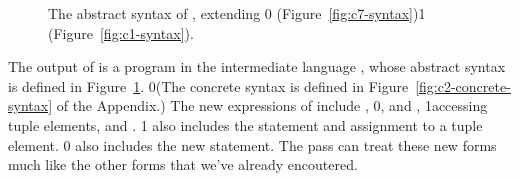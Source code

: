 \documentclass[7x10,nocrop]{TimesAPriori_MIT}%
\newcommand{\gray}[1]{{\color{gray} #1}}
\def\racketEd{0}
\def\pythonEd{1}
\def\edition{1}
\newcommand{\racket}[1]{{\if\edition\racketEd{#1}\fi}}
\newcommand{\python}[1]{{\if\edition\pythonEd #1\fi}}
\begin{document}
\newcommand{\CtupASTPython}{
\begin{array}{lcl}
\Exp &::= & \GET{\Atm}{\Atm} \MID \ALLOCATE{\Int}{\Type} \\
      &\MID& \GLOBALVALUE{\Var} \MID \LEN{\Atm} \\
\Stmt &::=& \COLLECT{\Int} \\
     &\MID& \ASSIGN{\PUT{\Atm}{\Atm}}{\Atm} 
\end{array}
}

\begin{figure}[tp]
\fbox{
  \begin{minipage}{0.96\textwidth}
    \small
{\if\edition\racketEd    
\[
\begin{array}{l}
  \gray{\CvarASTRacket} \\ \hline
  \gray{\CifASTRacket} \\ \hline
  \gray{\CloopASTRacket} \\ \hline
  \CtupASTRacket \\
  \begin{array}{lcl}
    \LangCVecM{} & ::= & \CPROGRAM{\itm{info}}{\LP\LP\itm{label}\,\key{.}\,\Tail\RP\ldots\RP}
  \end{array}
\end{array}
\]
\fi}
{\if\edition\pythonEd
\[
\begin{array}{l}
  \gray{\CifASTPython} \\ \hline
  \CtupASTPython \\
\begin{array}{lcl}
\LangCVecM{} & ::= & \CPROGRAM{\itm{info}}{\LC\itm{label}\key{:}\,\Stmt^{*}, \ldots \RC}
\end{array}
\end{array}
\]
\fi}
\end{minipage}
}
\caption{The abstract syntax of \LangCVec{}, extending
  \racket{\LangCLoop{} (Figure~\ref{fig:c7-syntax})}\python{\LangCIf{}
  (Figure~\ref{fig:c1-syntax})}.}
\label{fig:c2-syntax}
\end{figure}

The output of  is a program in the
intermediate language \LangCVec{}, whose abstract syntax is defined in
Figure~\ref{fig:c2-syntax}.
%
\racket{(The concrete syntax is defined in
  Figure~\ref{fig:c2-concrete-syntax} of the Appendix.)}
%
The new expressions of \LangCVec{} include ,
%
\racket{, and ,}
%
\python{accessing tuple elements,}
%
and .
%
\python{\LangCVec{} also includes the  statement and
assignment to a tuple element.}
%
\racket{\LangCVec{} also includes the new \code{collect} statement.}
%
The  pass can treat these new forms much like
the other forms that we've already encoutered.
\end{document}
